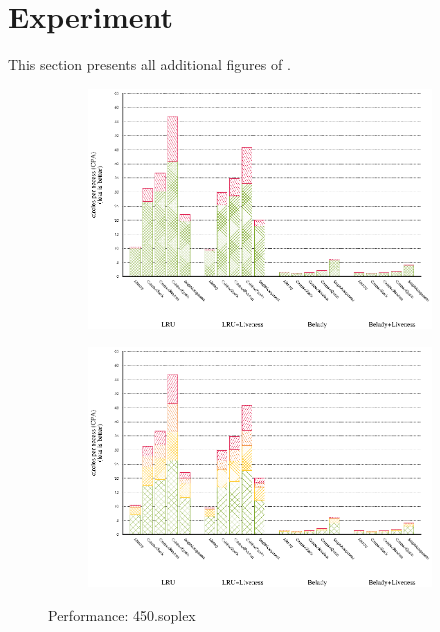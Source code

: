 \section{Experiment}\label{app:experiment}

This section presents all additional figures of .

\begin{figure}[!ht]
    \begin{subfigure}[b]{0.5\textwidth}%
    \includegraphics[width=\textwidth]{figs/plots/perf-misses-450-soplex.eps}
  \end{subfigure}%
  \begin{subfigure}[b]{0.5\textwidth}%
    \includegraphics[width=\textwidth]{figs/plots/perf-450-soplex.eps}
  \end{subfigure}%
  \caption{Performance: 450.soplex}
  \label{fig:performance-450-soplex}
\end{figure}

